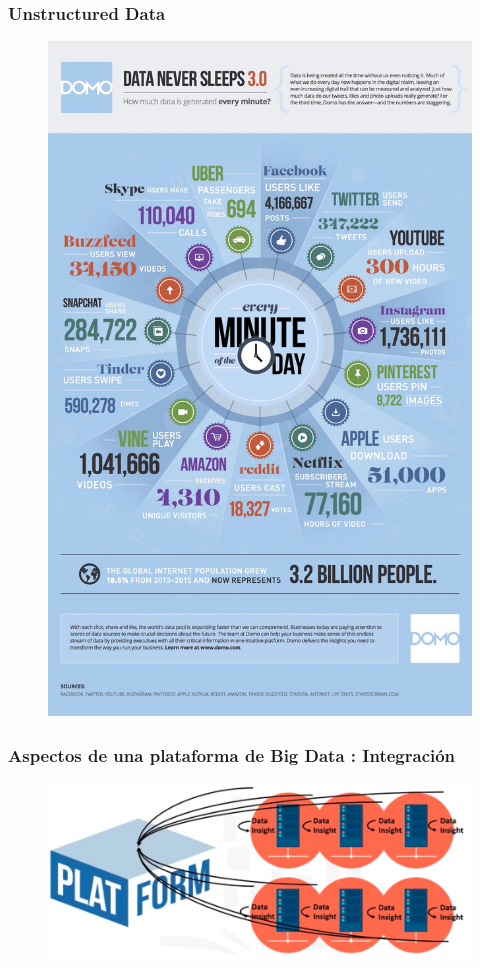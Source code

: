 \documentclass{beamer}
\begin{document}
\begin{frame}
\frametitle{Unstructured Data}
\begin{figure}
\includegraphics[scale=0.11]{img/2_Unstructured_Data}
\end{figure}
\end{frame}



\begin{frame}
\frametitle{Aspectos de una plataforma de Big Data : Integraci\'on}
\begin{figure}
\includegraphics[scale=0.3]{img/3_Integration}
\end{figure}
\end{frame}
\end{document}
